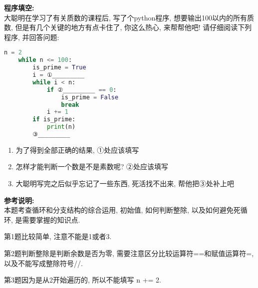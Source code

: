 \documentclass[hideanswer=true,
enfont=empty,	%
zhfont=empty,	%
mathfont=newtxmath,
]{cmcthesis}
\begin{document}
\begin{problem}
	\textbf{程序填空:{}} \\
	大聪明在学习了有关质数的课程后, 写了个python程序, 想要输出100以内的所有质数, 但是有几个关键的地方有点卡住了, 你这么热心, 来帮帮他吧! 请仔细阅读下列程序, 并回答问题:
	
\begin{lstlisting}[style=tex, language=python]
	n = 2
	while n <= 100:
	    is_prime = True
	    i = ①_________           
	    while i < n:
	        if ②_________ == 0:
	            is_prime = False
	            break
	        i += 1
	    if is_prime:
	        print(n)
	    ③_________
\end{lstlisting}
	\begin{enumerate}[label=\arabic*), parsep=0ex,itemsep=0ex,leftmargin=2em, topsep=0ex]
		\item 为了得到全部正确的结果, ①处应该填写 
		\item 怎样才能判断一个数是不是素数呢? ②处应该填写 
		\item 大聪明写完之后似乎忘记了一些东西, 死活找不出来, 帮他把③处补上吧 
\end{enumerate}
\end{problem}

\begin{answer}
	\textbf{参考说明:}\\
	本题考查循环和分支结构的综合运用, 初始值, 如何判断整除, 以及如何避免死循环, 是需要掌握的知识点.
	 
	第1题比较简单, 注意不能是1或者3.
	
	第2题判断整除是判断余数是否为零, 需要注意区分比较运算符==和赋值运算符=, 以及不能写成整除符号//.
	
	第3题因为是从2开始遍历的, 所以不能填写 n += 2.
\end{answer}
\end{document}
